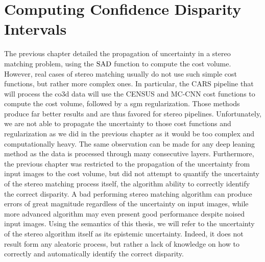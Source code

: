 \chapter{Computing Confidence Disparity Intervals}\label{chap:epistemic_uncertainty}

The previous chapter detailed the propagation of  uncertainty in a stereo matching problem, using the $\mathrm{SAD}$ function to compute the cost volume. However, real cases of stereo matching usually do not use such simple cost functions, but rather more complex ones. In particular, the CARS pipeline that will process the \acrshort{co3d} data will use the CENSUS and MC-CNN cost functions  \cite{zabih_non-parametric_1994,zbontar_stereo_2016} to compute the cost volume, followed by a \acrshort{sgm} regularization. Those methods produce far better results and are thus favored for stereo pipelines. Unfortunately, we are not able to propagate the uncertainty to those cost functions and regularization as we did in the previous chapter as it would be too complex and computationally heavy. The same observation can be made for any deep leaning method \cite{laga_survey_2022} as the data is processed through many consecutive layers. Furthermore, the previous chapter was restricted to the propagation of the uncertainty from input images to the cost volume, but did not attempt to quantify the uncertainty of the stereo matching process itself, \ie the algorithm ability to correctly identify the correct disparity. A bad performing stereo matching algorithm can produce errors of great magnitude regardless of the uncertainty on input images, while more advanced algorithm may even present good performance despite noised input images. Using the semantics of this thesis, we will refer to the uncertainty of the stereo algorithm itself as its epistemic uncertainty. Indeed, it does not result form any aleatoric process, but rather a lack of knowledge on how to correctly and automatically identify the correct disparity.

